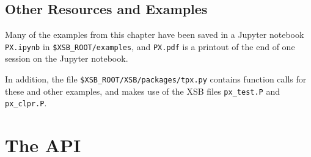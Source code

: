 \subsection{Other \px{} Resources and Examples}

Many of the examples from this chapter have been saved in a Jupyter
notebook {\tt PX.ipynb} in {\tt \$XSB\_ROOT/examples}, and {\tt PX.pdf}
is a printout of the end of one session on the Jupyter notebook.

In addition, the file {\tt \$XSB\_ROOT/XSB/packages/tpx.py} contains
function calls for these and other examples, and makes use of the XSB
files {\tt px\_test.P} and {\tt px\_clpr.P}.

\section{The \px{} API}

